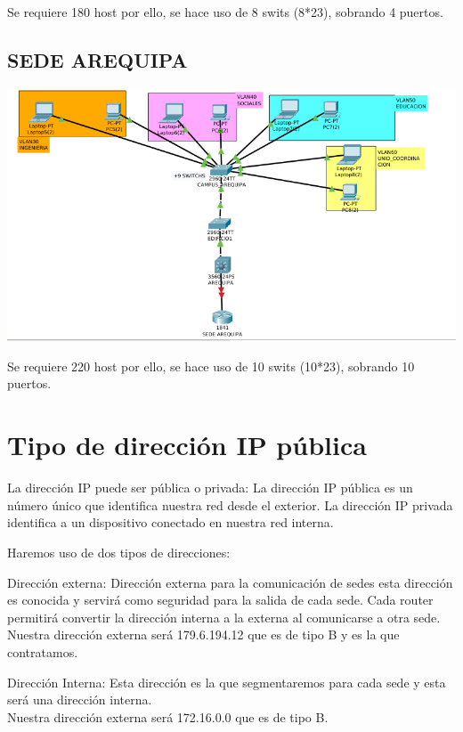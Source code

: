 \begin{definicion}[]
{
Se requiere 180 host por ello, se hace uso de 8 swits (8*23), sobrando 4 puertos.
}
\end{definicion}

\subsection{SEDE AREQUIPA}
\includegraphics[scale=0.6]{img/AREQUIPA.png} 

\begin{definicion}[]
{
Se requiere 220 host por ello, se hace uso de 10 swits (10*23), sobrando 10 puertos.
}
\end{definicion}


\section{Tipo de direcci\'on IP p\'ublica}
\begin{caja}[]
{
La direcci\'on IP puede ser p\'ublica o privada: La direcci\'on IP p\'ublica es un n\'umero \'unico que identifica nuestra red desde el exterior. La direcci\'on IP privada  identifica a un dispositivo conectado en nuestra red interna.
}
\end{caja}
 Haremos uso de dos tipos de direcciones:
\begin{definicion}[]
{
Direcci\'on externa:
	Direcci\'on externa para la comunicaci\'on de sedes esta direcci\'on es conocida y servir\'a como seguridad para la salida de cada sede. Cada router permitir\'a convertir la direcci\'on interna a la externa al comunicarse a otra sede.
 \\
 Nuestra direcci\'on externa ser\'a 179.6.194.12 que es de tipo B y es la que contratamos.
 }
\end{definicion}
\begin{definicion}[]
{
Direcci\'on Interna:
	Esta direcci\'on es la que segmentaremos para cada sede y esta ser\'a una direcci\'on interna.
 \\
 Nuestra direcci\'on externa ser\'a 172.16.0.0 que es de tipo B.
 }
\end{definicion}


